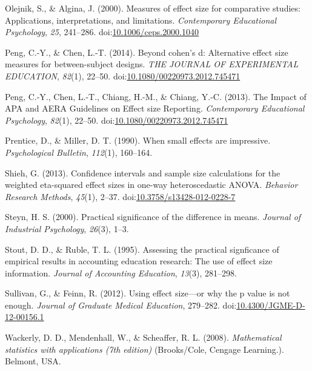 \documentclass[man]{apa6}
\begin{document}
\leavevmode\hypertarget{ref-Olejnik_Algina_2000}{}%
Olejnik, S., \& Algina, J. (2000). Measures of effect size for comparative studies: Applications, interpretations, and limitations. \emph{Contemporary Educational Psychology}, \emph{25}, 241--286. doi:\href{https://doi.org/10.1006/ceps.2000.1040}{10.1006/ceps.2000.1040}

\leavevmode\hypertarget{ref-Peng_and_Chen_2014}{}%
Peng, C.-Y., \& Chen, L.-T. (2014). Beyond cohen's d: Alternative effect size measures for between-subject designs. \emph{THE JOURNAL OF EXPERIMENTAL EDUCATION}, \emph{82}(1), 22--50. doi:\href{https://doi.org/10.1080/00220973.2012.745471}{10.1080/00220973.2012.745471}

\leavevmode\hypertarget{ref-Peng_et_al_2013}{}%
Peng, C.-Y., Chen, L.-T., Chiang, H.-M., \& Chiang, Y.-C. (2013). The Impact of APA and AERA Guidelines on Effect size Reporting. \emph{Contemporary Educational Psychology}, \emph{82}(1), 22--50. doi:\href{https://doi.org/10.1080/00220973.2012.745471}{10.1080/00220973.2012.745471}

\leavevmode\hypertarget{ref-Prentice_Miller_1992}{}%
Prentice, D., \& Miller, D. T. (1990). When small effects are impressive. \emph{Psychological Bulletin}, \emph{112}(1), 160--164.

\leavevmode\hypertarget{ref-Shieh_2013}{}%
Shieh, G. (2013). Confidence intervals and sample size calculations for the weighted eta-squared effect sizes in one-way heteroscedastic ANOVA. \emph{Behavior Research Methods}, \emph{45}(1), 2--37. doi:\href{https://doi.org/10.3758/s13428-012-0228-7}{10.3758/s13428-012-0228-7}

\leavevmode\hypertarget{ref-Steyn_2000}{}%
Steyn, H. S. (2000). Practical significance of the difference in means. \emph{Journal of Industrial Psychology}, \emph{26}(3), 1--3.

\leavevmode\hypertarget{ref-Stout_Ruble_1995}{}%
Stout, D. D., \& Ruble, T. L. (1995). Assessing the practical signficance of empirical results in accounting education research: The use of effect size information. \emph{Journal of Accounting Education}, \emph{13}(3), 281--298.

\leavevmode\hypertarget{ref-Sullivan_Feinn_2012}{}%
Sullivan, G., \& Feinn, R. (2012). Using effect size---or why the p value is not enough. \emph{Journal of Graduate Medical Education}, 279--282. doi:\href{https://doi.org/10.4300/JGME-D-12-00156.1}{10.4300/JGME-D-12-00156.1}

\leavevmode\hypertarget{ref-Wackerly_et_al_2008}{}%
Wackerly, D. D., Mendenhall, W., \& Scheaffer, R. L. (2008). \emph{Mathematical statistics with applications (7th edition)} (Brooks/Cole, Cengage Learning.). Belmont, USA.
\end{document}
